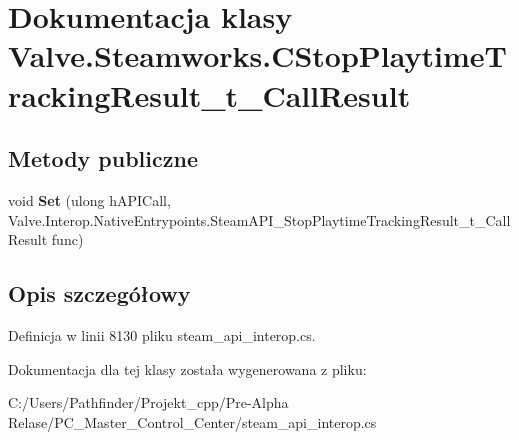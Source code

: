 \hypertarget{class_valve_1_1_steamworks_1_1_c_stop_playtime_tracking_result__t___call_result}{}\section{Dokumentacja klasy Valve.\+Steamworks.\+C\+Stop\+Playtime\+Tracking\+Result\+\_\+t\+\_\+\+Call\+Result}
\label{class_valve_1_1_steamworks_1_1_c_stop_playtime_tracking_result__t___call_result}
\subsection*{Metody publiczne}
\begin{DoxyCompactItemize}
\item 
\mbox{\label{class_valve_1_1_steamworks_1_1_c_stop_playtime_tracking_result__t___call_result_ac8fde4cd67afaa0e6dca409e9bbcdcd9}} 
void {\bfseries Set} (ulong h\+A\+P\+I\+Call, Valve.\+Interop.\+Native\+Entrypoints.\+Steam\+A\+P\+I\+\_\+\+Stop\+Playtime\+Tracking\+Result\+\_\+t\+\_\+\+Call\+Result func)
\end{DoxyCompactItemize}


\subsection{Opis szczegółowy}


Definicja w linii 8130 pliku steam\+\_\+api\+\_\+interop.\+cs.



Dokumentacja dla tej klasy została wygenerowana z pliku\+:\begin{DoxyCompactItemize}
\item 
C\+:/\+Users/\+Pathfinder/\+Projekt\+\_\+cpp/\+Pre-\/\+Alpha Relase/\+P\+C\+\_\+\+Master\+\_\+\+Control\+\_\+\+Center/steam\+\_\+api\+\_\+interop.\+cs\end{DoxyCompactItemize}
